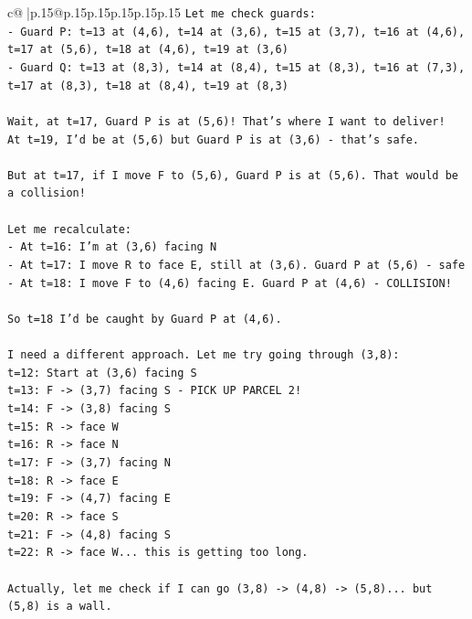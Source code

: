 \documentclass{article}
\begin{document}
{\begin{supertabular}{c@{$\;$}|p{.15\linewidth}@{}p{.15\linewidth}p{.15\linewidth}p{.15\linewidth}p{.15\linewidth}p{.15\linewidth}}
{{{\texttt{Let me check guards:} \\
\texttt{{-} Guard P: t=13 at (4,6), t=14 at (3,6), t=15 at (3,7), t=16 at (4,6), t=17 at (5,6), t=18 at (4,6), t=19 at (3,6)} \\
\texttt{{-} Guard Q: t=13 at (8,3), t=14 at (8,4), t=15 at (8,3), t=16 at (7,3), t=17 at (8,3), t=18 at (8,4), t=19 at (8,3)} \\
\\ 
\texttt{Wait, at t=17, Guard P is at (5,6)! That's where I want to deliver!} \\
\texttt{At t=19, I'd be at (5,6) but Guard P is at (3,6) {-} that's safe.} \\
\\ 
\texttt{But at t=17, if I move F to (5,6), Guard P is at (5,6). That would be a collision!} \\
\\ 
\texttt{Let me recalculate:} \\
\texttt{{-} At t=16: I'm at (3,6) facing N} \\
\texttt{{-} At t=17: I move R to face E, still at (3,6). Guard P at (5,6) {-} safe} \\
\texttt{{-} At t=18: I move F to (4,6) facing E. Guard P at (4,6) {-} COLLISION!} \\
\\ 
\texttt{So t=18 I'd be caught by Guard P at (4,6).} \\
\\ 
\texttt{I need a different approach. Let me try going through (3,8):} \\
\texttt{t=12: Start at (3,6) facing S} \\
\texttt{t=13: F {-}> (3,7) facing S {-} PICK UP PARCEL 2!} \\
\texttt{t=14: F {-}> (3,8) facing S} \\
\texttt{t=15: R {-}> face W} \\
\texttt{t=16: R {-}> face N} \\
\texttt{t=17: F {-}> (3,7) facing N} \\
\texttt{t=18: R {-}> face E} \\
\texttt{t=19: F {-}> (4,7) facing E} \\
\texttt{t=20: R {-}> face S} \\
\texttt{t=21: F {-}> (4,8) facing S} \\
\texttt{t=22: R {-}> face W... this is getting too long.} \\
\\ 
\texttt{Actually, let me check if I can go (3,8) {-}> (4,8) {-}> (5,8)... but (5,8) is a wall.} \\
}}}
\end{supertabular}}
\end{document}
